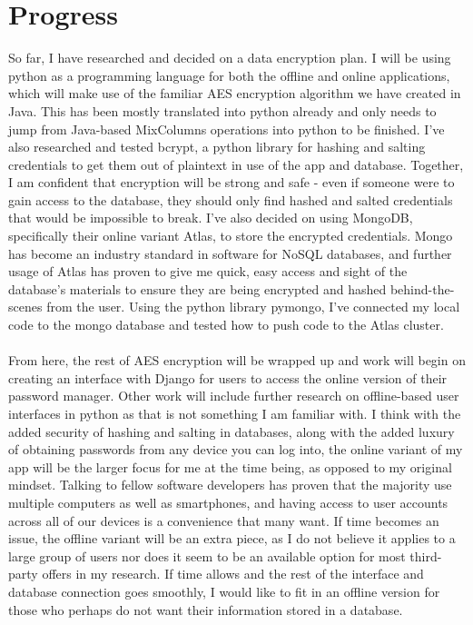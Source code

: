 \documentclass{article}
\numberwithin{equation}{section} %
\numberwithin{figure}{section} %
\numberwithin{table}{section} %
\begin{document}
\section{Progress}
So far, I have researched and decided on a data encryption plan. I will be using python as a programming language for both the offline and online applications, which will make use of the familiar AES encryption algorithm we have created in Java. This has been mostly translated into python already and only needs to jump from Java-based MixColumns operations into python to be finished. I've also researched and tested bcrypt, a python library for hashing and salting credentials to get them out of plaintext in use of the app and database. Together, I am confident that encryption will be strong and safe - even if someone were to gain access to the database, they should only find hashed and salted credentials that would be impossible to break. I've also decided on using MongoDB, specifically their online variant Atlas, to store the encrypted credentials. Mongo has become an industry standard in software for NoSQL databases, and further usage of Atlas has proven to give me quick, easy access and sight of the database's materials to ensure they are being encrypted and hashed behind-the-scenes from the user. Using the python library pymongo, I've connected my local code to the mongo database and tested how to push code to the Atlas cluster. \\\\
From here, the rest of AES encryption will be wrapped up and work will begin on creating an interface with Django for users to access the online version of their password manager. Other work will include further research on offline-based user interfaces in python as that is not something I am familiar with. I think with the added security of hashing and salting in databases, along with the added luxury of obtaining passwords from any device you can log into, the online variant of my app will be the larger focus for me at the time being, as opposed to my original mindset. Talking to fellow software developers has proven that the majority use multiple computers as well as smartphones, and having access to user accounts across all of our devices is a convenience that many want. If time becomes an issue, the offline variant will be an extra piece, as I do not believe it applies to a large group of users nor does it seem to be an available option for most third-party offers in my research. If time allows and the rest of the interface and database connection goes smoothly, I would like to fit in an offline version for those who perhaps do not want their information stored in a database.
\end{document}
